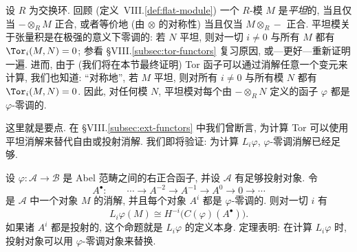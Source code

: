 \begin{example}\label{ex:8.2-flat}
设 $R$ 为交换环. 回顾 (定义~VIII.\ref{def:flat-module}) 一个 $R$-模 $M$ 是\emph{平坦}的, 当且仅当 $-\otimes_R M$ 正合, 或者等价地 (由 $\otimes$ 的对称性) 当且仅当 $M\otimes_R-$ 正合. 平坦模关于张量积是在极强的意义下零调的: 若 $N$ 平坦, 则对一切 $i\neq 0$ 与所有 $M$ 都有 $\Tor_i(M,N)=0$; 参看 §VIII.\ref{subsec:tor-functors} 复习原因, 或---更好---重新证明一遍. 进而, 由于 (我们将在本节最终证明) Tor 函子可以通过消解任意一个变元来计算, 我们也知道: ``对称地'', 若 $M$ 平坦, 则对所有 $i\neq 0$ 与所有模 $N$ 都有 $\Tor_i(M,N)=0$. 因此, 对任何模 $N$, 平坦模对每个由 $-\otimes_R N$ 定义的函子 $\varphi$ 都是 $\varphi$-零调的.
\end{example}

这里就是要点. 在 §VIII.\ref{subsec:ext-functors} 中我们曾断言, 为计算 Tor 可以使用平坦消解来替代自由或投射消解. 我们即将验证: 为计算 $L_i\varphi$, $\varphi$-零调消解已经足够.

\begin{theorem}\label{thm:8.3-acyclic-res}
设 $\varphi:\mathcal{A}\to\mathcal{B}$ 是 Abel 范畴之间的右正合函子, 并设 $\mathcal{A}$ 有足够投射对象. 令
\[
A^\bullet:\qquad \cdots \longrightarrow A^{-2} \longrightarrow A^{-1} \longrightarrow A^0 \longrightarrow 0 \longrightarrow \cdots
\]
是 $\mathcal{A}$ 中一个对象 $M$ 的消解, 并且每个对象 $A^i$ 都是 $\varphi$-零调的. 则对一切 $i$ 有
\[
L_i\varphi(M)\cong H^{-i}\bigl(C(\varphi)(A^\bullet)\bigr).
\]
如果诸 $A^i$ 都是投射的, 这个命题就是 $L_i\varphi$ 的定义本身. 定理表明: 在计算 $L_i\varphi$ 时, 投射对象可以用 $\varphi$-零调对象来替换.
\end{theorem}

